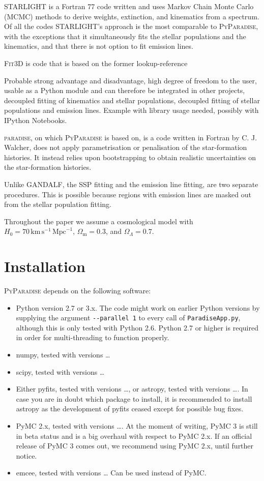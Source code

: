 \documentclass[usenatbib,usegraphicx,useAMS,onecolumn]{mn2e}
\newcommand{\codeline}[1]{\lstinline|#1|}
\begin{document}
\textsc{STARLIGHT} is a Fortran 77 code written and uses Markov Chain Monte Carlo (MCMC) methods to derive weights, extinction, and kinematics from a spectrum.
Of all the codes \textsc{STARLIGHT}'s approach is the most comparable to \textsc{PyParadise}, with the exceptions that it simultaneously fits the stellar populations and the kinematics, and that there is not option to fit emission lines.

\textsc{Fit3D} is code that is based on the former {lookup-reference}

Probable strong advantage and disadvantage, high degree of freedom to the user, usable as a Python module and can therefore be integrated in other projects, decoupled fitting of kinematics and stellar populations, decoupled fitting of stellar populations and emission lines.
Example with library usage needed, possibly with IPython Notebooks.

\textsc{paradise}, on which \textsc{PyParadise} is based on, is a code written in Fortran by C. J. Walcher, does not apply parametrisation or penalisation of the star-formation histories.
It instead relies upon bootstrapping to obtain realistic uncertainties on the star-formation histories.

Unlike \textsc{GANDALF}, the SSP fitting and the emission line fitting, are two separate procedures.
This is possible because regions with emission lines are masked out from the stellar population fitting.

Throughout the paper we assume a cosmological model with 
$H_0=70\,\mathrm{km}\,\mathrm{s}^{-1}\,\mathrm{Mpc}^{-1}$, $\Omega_{\mathrm{m}}=0.3$, and $\Omega_\Lambda=0.7$.

\section{Installation}
\label{sec:installation}
\textsc{PyParadise} depends on the following software:
\begin{itemize}
    \item Python version 2.7 or 3.x.
        The code might work on earlier Python versions by supplying the argument \codeline{--parallel 1} to every call of \codeline{ParadiseApp.py}, although this is only tested with Python 2.6.
        Python 2.7 or higher is required in order for multi-threading to function properly.
    \item numpy, tested with versions \ldots
    \item scipy, tested with versions \ldots
    \item Either pyfits, tested with versions \ldots, or astropy, tested with versions \ldots.
        In case you are in doubt which package to install, it is recommended to install astropy as the development of pyfits ceased except for possible bug fixes.
    \item PyMC 2.x, tested with versions \ldots.
        At the moment of writing, PyMC 3 is still in beta status and is a big overhaul with respect to PyMC 2.x.
        If an official release of PyMC 3 comes out, we recommend using PyMC 2.x, until further notice.
    \item emcee, tested with versions \ldots
        Can be used instead of PyMC.
\end{itemize}
\end{document}

